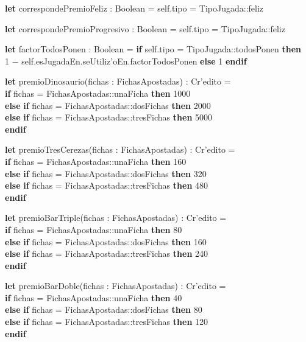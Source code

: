 \begin{itemize}
    \textbf{let} correspondePremioFeliz : Boolean = self.tipo = TipoJugada::feliz
    
    \textbf{let} correspondePremioProgresivo : Boolean = self.tipo = TipoJugada::feliz
    
    \textbf{let} factorTodosPonen : Boolean = \textbf{if} self.tipo = TipoJugada::todosPonen \textbf{then}\\ 1 $-$ self.esJugadaEn.seUtiliz'oEn.factorTodosPonen \textbf{else} 1 \textbf{endif}

    \textbf{let} premioDinosaurio(fichas : FichasApostadas) : Cr'edito =\\
        \textbf{if} fichas = FichasApostadas::unaFicha \textbf{then} 1000\\
        \textbf{else} \textbf{if} fichas = FichasApostadas::dosFichas \textbf{then} 2000\\
        \textbf{else} \textbf{if} fichas = FichasApostadas::tresFichas \textbf{then} 5000\\
        \textbf{endif}

    \textbf{let} premioTresCerezas(fichas : FichasApostadas) : Cr'edito =\\
        \textbf{if} fichas = FichasApostadas::unaFicha \textbf{then} 160\\
        \textbf{else} \textbf{if} fichas = FichasApostadas::dosFichas \textbf{then} 320\\
        \textbf{else} \textbf{if} fichas = FichasApostadas::tresFichas \textbf{then} 480\\
        \textbf{endif}

    \textbf{let} premioBarTriple(fichas : FichasApostadas) : Cr'edito =\\
        \textbf{if} fichas = FichasApostadas::unaFicha \textbf{then} 80\\
        \textbf{else} \textbf{if} fichas = FichasApostadas::dosFichas \textbf{then} 160\\
        \textbf{else} \textbf{if} fichas = FichasApostadas::tresFichas \textbf{then} 240\\
        \textbf{endif}

    \textbf{let} premioBarDoble(fichas : FichasApostadas) : Cr'edito =\\
        \textbf{if} fichas = FichasApostadas::unaFicha \textbf{then} 40\\
        \textbf{else} \textbf{if} fichas = FichasApostadas::dosFichas \textbf{then} 80\\
        \textbf{else} \textbf{if} fichas = FichasApostadas::tresFichas \textbf{then} 120\\
        \textbf{endif}


\end{itemize}
